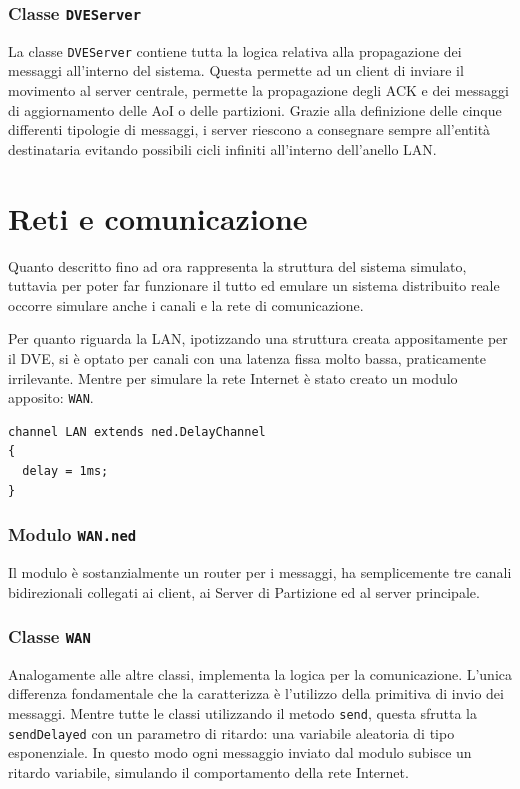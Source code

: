 \documentclass[a4paper, 11pt, oneside]{book}
\theoremstyle{definition}
\theoremstyle{remark}
\begin{document}
\subsubsection{Classe \texttt{DVEServer}}
La classe \texttt{DVEServer} contiene tutta la logica relativa alla propagazione
dei messaggi all'interno del sistema. Questa permette ad un client di inviare
il movimento al server centrale, permette la propagazione degli ACK e dei
messaggi di aggiornamento delle AoI o delle partizioni.
Grazie alla definizione delle cinque differenti tipologie di messaggi, i server
riescono a consegnare sempre all'entità destinataria evitando
possibili cicli infiniti all'interno dell'anello LAN.

\section{Reti e comunicazione}
Quanto descritto fino ad ora rappresenta la struttura del sistema simulato,
tuttavia per poter far funzionare il tutto ed emulare un sistema distribuito
reale occorre simulare anche i canali e la rete di comunicazione.

Per quanto riguarda la LAN, ipotizzando una struttura creata appositamente
per il DVE, si è optato per canali con una latenza fissa molto bassa,
praticamente irrilevante. Mentre per simulare la rete Internet è stato creato
un modulo apposito: \texttt{WAN}.
\begin{lstlisting}
channel LAN extends ned.DelayChannel
{
  delay = 1ms;
}
\end{lstlisting}

\subsubsection{Modulo \texttt{WAN.ned}}
Il modulo è sostanzialmente un router per i messaggi, ha semplicemente tre
canali bidirezionali collegati ai client, ai Server di Partizione ed al server
principale.
\subsubsection{Classe \texttt{WAN}}
Analogamente alle altre classi, implementa la logica per la comunicazione.
L'unica differenza fondamentale che la caratterizza è l'utilizzo della
primitiva di invio dei messaggi. Mentre tutte le classi utilizzando il metodo
\texttt{send}, questa sfrutta la \texttt{sendDelayed} con un parametro
di ritardo: una variabile aleatoria di tipo esponenziale.
In questo modo ogni messaggio inviato dal
modulo subisce un ritardo variabile, simulando il comportamento della rete
Internet.
\end{document}
